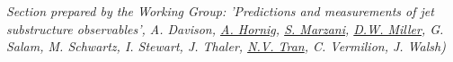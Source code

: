 



%



{\it Section prepared by the Working Group: 'Predictions and measurements of jet substructure observables', A. Davison, \underline{A. Hornig}, \underline{S. Marzani}, \underline{D.W. Miller}, G. Salam, M. Schwartz, I. Stewart, J. Thaler, \underline{N.V. Tran}, C. Vermilion,  J. Walsh) 
}







